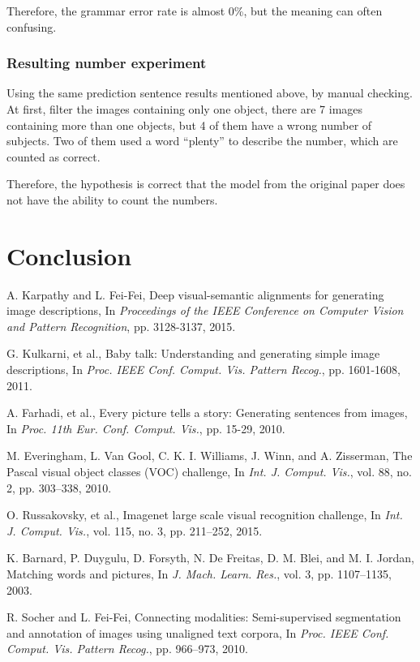 \documentclass[10pt,twocolumn,letterpaper]{article}
\begin{document}
\begin{itemize}
Therefore, the grammar error rate is almost 0\%, but the meaning can often confusing.


\subsubsection{Resulting number experiment} \label{sec:rn}
Using the same prediction sentence results mentioned above, by manual checking.
At first, filter the images containing only one object, there are 7 images containing more than one objects,
but 4 of them have a wrong number of subjects. Two of them used a word ``plenty'' to describe the number, which are counted as correct.

Therefore, the hypothesis is correct that the model from the original paper does not have the ability to count the numbers.


\section{Conclusion}


\begin{thebibliography}{99}
A. Karpathy and L. Fei-Fei, Deep visual-semantic alignments for generating image descriptions,
In \textit{Proceedings of the IEEE Conference on Computer Vision and Pattern Recognition}, pp. 3128-3137, 2015.

G. Kulkarni, et al., Baby talk: Understanding and generating simple image descriptions,
In \textit{Proc. IEEE Conf. Comput. Vis. Pattern Recog.}, pp. 1601-1608, 2011.

A. Farhadi, et al., Every picture tells a story: Generating sentences from images,
In \textit{Proc. 11th Eur. Conf. Comput. Vis.}, pp. 15-29, 2010.

M. Everingham, L. Van Gool, C. K. I. Williams, J. Winn, and A. Zisserman, The Pascal visual object classes (VOC) challenge,
In \textit{Int. J. Comput. Vis.}, vol. 88, no. 2, pp. 303–338, 2010.

O. Russakovsky, et al., Imagenet large scale visual recognition challenge,
In \textit{Int. J. Comput. Vis.}, vol. 115, no. 3, pp. 211–252, 2015.

K. Barnard, P. Duygulu, D. Forsyth, N. De Freitas, D. M. Blei, and M. I. Jordan, Matching words and pictures,
In \textit{J. Mach. Learn. Res.}, vol. 3, pp. 1107–1135, 2003.

R. Socher and L. Fei-Fei, Connecting modalities: Semi-supervised segmentation and annotation of images using unaligned text corpora,
In \textit{Proc. IEEE Conf. Comput. Vis. Pattern Recog.}, pp. 966–973, 2010.


\end{thebibliography}
\end{itemize}
\end{document}
